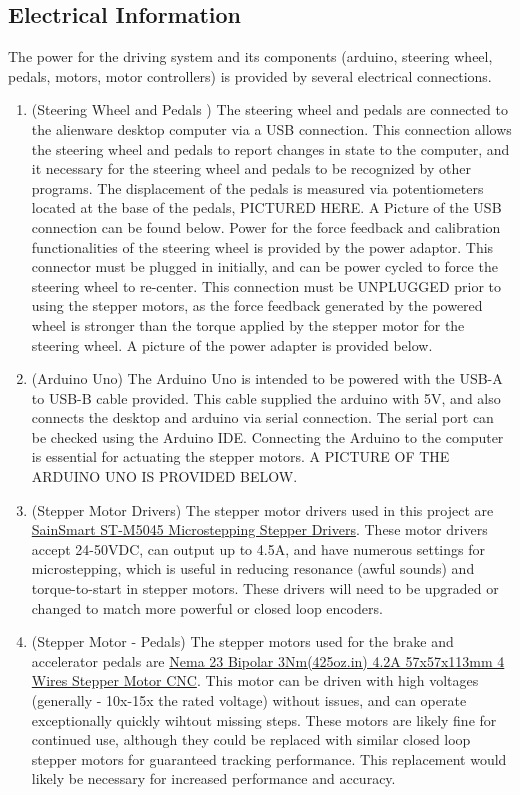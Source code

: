 \documentclass{article}
\begin{document}
\subsection{Electrical Information}
The power for the driving system and its components (arduino, steering wheel, pedals, motors, motor controllers) is provided by several electrical connections.
\begin{enumerate}
\item(Steering Wheel and Pedals ) The steering wheel and pedals are connected to the alienware desktop computer via a USB connection. This connection allows the steering wheel and pedals to report changes in state to the computer, and it necessary for the steering wheel and pedals to be recognized by other programs. The displacement of the pedals is measured via potentiometers located at the base of the pedals, PICTURED HERE. A Picture of the USB connection can be found below. Power for the force feedback and calibration functionalities of the steering wheel is provided by the power adaptor. This connector must be plugged in initially, and can be power cycled to force the steering wheel to re-center. This connection must be UNPLUGGED prior to using the stepper motors, as the force feedback generated by the powered wheel is stronger than the torque applied by the stepper motor for the steering wheel. A picture of the power adapter is provided below.
\item(Arduino Uno) The Arduino Uno is intended to be powered with the USB-A to USB-B cable provided. This cable supplied the arduino with 5V, and also connects the desktop and arduino via serial connection. The serial port can be checked using the Arduino IDE. Connecting the Arduino to the computer is essential for actuating the stepper motors.
A PICTURE OF THE ARDUINO UNO IS PROVIDED BELOW.
\item(Stepper Motor Drivers) The stepper motor drivers used in this project are \href{https://www.amazon.com/SainSmart-Micro-Stepping-Stepper-Driver-ST-M5045/dp/B00DFSF9GE/ref=cm_cr_arp_d_product_top?ie=UTF8}{SainSmart ST-M5045 Microstepping Stepper Drivers}. These motor drivers accept 24-50VDC, can output up to 4.5A, and have numerous settings for microstepping, which is useful in reducing resonance (awful sounds) and torque-to-start in stepper motors. These drivers will need to be upgraded or changed to match more powerful or closed loop encoders.
\item(Stepper Motor - Pedals) The stepper motors used for the brake and accelerator pedals are \href{https://www.omc-stepperonline.com/nema-23-bipolar-3nm-425oz-in-4-2a-57x57x114mm-4-wires-stepper-motor-cnc-23hs45-4204s}{Nema 23 Bipolar 3Nm(425oz.in) 4.2A 57x57x113mm 4 Wires Stepper Motor CNC}. This motor can be driven with high voltages (generally - 10x-15x the rated voltage) without issues, and can operate exceptionally quickly wihtout missing steps. These motors are likely fine for continued use, although they could be replaced with similar closed loop stepper motors for guaranteed tracking performance. This replacement would likely be necessary for increased performance and accuracy.

\end{enumerate}
\end{document}
